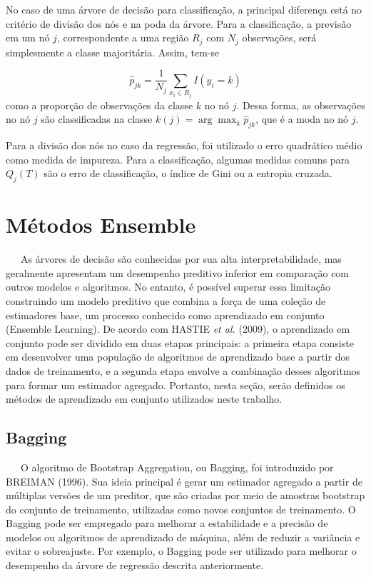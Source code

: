 \documentclass[
  12pt,
  a4paper,
]{scrreprt}
\begin{document}
\vspace{12pt}

No caso de uma árvore de decisão para classificação, a principal
diferença está no critério de divisão dos nós e na poda da árvore. Para
a classificação, a previsão em um nó \(j\), correspondente a uma região
\(R_j\) com \(N_j\) observações, será simplesmente a classe majoritária.
Assim, tem-se

\[
\hat{p}_{jk} = \frac{1}{N_j}\sum_{x_i \in R_j} I\left(y_i = k\right)
\] como a proporção de observações da classe \(k\) no nó \(j\). Dessa
forma, as observações no nó \(j\) são classificadas na classe
\(k\left(j\right) = \arg \max_{k} \hat{p}_{jk}\), que é a moda no nó
\(j\).

\vspace{12pt}

Para a divisão dos nós no caso da regressão, foi utilizado o erro
quadrático médio como medida de impureza. Para a classificação, algumas
medidas comuns para \(Q_j\left(T\right)\) são o erro de classificação, o
índice de Gini ou a entropia cruzada.

\section{Métodos Ensemble}\label{muxe9todos-ensemble}

~~~As árvores de decisão são conhecidas por sua alta interpretabilidade,
mas geralmente apresentam um desempenho preditivo inferior em comparação
com outros modelos e algoritmos. No entanto, é possível superar essa
limitação construindo um modelo preditivo que combina a força de uma
coleção de estimadores base, um processo conhecido como aprendizado em
conjunto (Ensemble Learning). De acordo com HASTIE \emph{et al.} (2009),
o aprendizado em conjunto pode ser dividido em duas etapas principais: a
primeira etapa consiste em desenvolver uma população de algoritmos de
aprendizado base a partir dos dados de treinamento, e a segunda etapa
envolve a combinação desses algoritmos para formar um estimador
agregado. Portanto, nesta seção, serão definidos os métodos de
aprendizado em conjunto utilizados neste trabalho.

\subsection{Bagging}\label{bagging}

~~~O algoritmo de Bootstrap Aggregation, ou Bagging, foi introduzido por
BREIMAN (1996). Sua ideia principal é gerar um estimador agregado a
partir de múltiplas versões de um preditor, que são criadas por meio de
amostras bootstrap do conjunto de treinamento, utilizadas como novos
conjuntos de treinamento. O Bagging pode ser empregado para melhorar a
estabilidade e a precisão de modelos ou algoritmos de aprendizado de
máquina, além de reduzir a variância e evitar o sobreajuste. Por
exemplo, o Bagging pode ser utilizado para melhorar o desempenho da
árvore de regressão descrita anteriormente.
\end{document}
